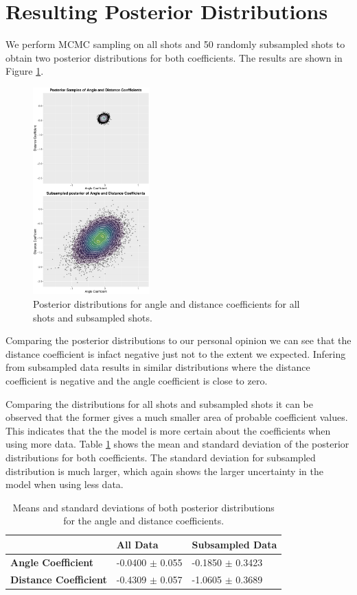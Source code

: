 \documentclass[9pt]{IEEEtran}
\begin{document}
\section{Resulting Posterior Distributions }
We perform MCMC sampling on all shots and 50 randomly subsampled shots to obtain two posterior distributions for both coefficients.
The results are shown in Figure \ref{fig:beta0}.
\begin{figure}[h]
    \centering
    \includegraphics[width=0.4\textwidth]{combined_plot_vertical.pdf}
    \caption{Posterior distributions for angle and distance coefficients for all shots and subsampled shots.}
    \label{fig:beta0}

\end{figure}
Comparing the posterior distributions to our personal opinion we can see that the distance coefficient is infact negative just not to the extent we expected.
Infering from subsampled data results in similar distributions where the distance coefficient is negative and the angle coefficient is close to zero.

Comparing the distributions for all shots and subsampled shots it can be observed that the former gives a much smaller area of probable coefficient values.
This indicates that the the model is more certain about the coefficients when using more data.
Table \ref{tab:beta0} shows the mean and standard deviation of the posterior distributions for both coefficients.
The standard deviation for subsampled distribution is much larger, which again shows the larger uncertainty in the model when using less data.
\begin{table}[!ht]
    \centering
    \begin{tabular}{lll}
        \textbf{} & \textbf{All Data} & \textbf{Subsampled Data} \\ \hline
        \textbf{Angle Coefficient} & -0.0400 $\pm$ 0.055 & -0.1850 $\pm$ 0.3423\\ 
        \textbf{Distance Coefficient} & -0.4309 $\pm$ 0.057 & -1.0605 $\pm$ 0.3689\\ 
    \end{tabular}
    \caption{Means and standard deviations of both posterior distributions for the angle and distance coefficients.}
    \label{tab:beta0}
\end{table}
\end{document}
